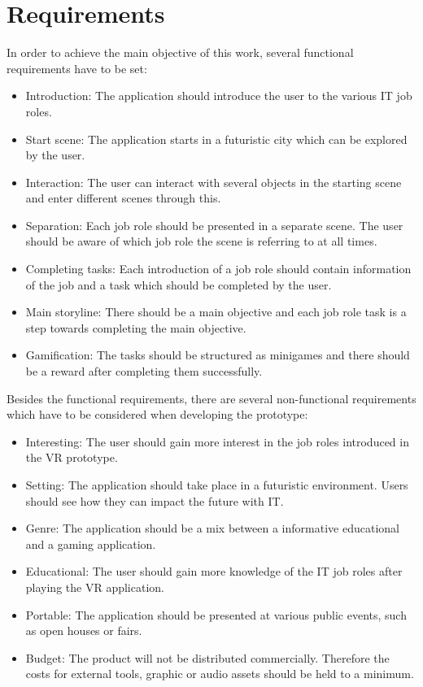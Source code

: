 \section{Requirements}
In order to achieve the main objective of this work, several functional requirements have to be set:\\
\begin{itemize}
\item Introduction: The application should introduce the user to the various IT job roles.
\item Start scene: The application starts in a futuristic city which can be explored by the user.
\item Interaction: The user can interact with several objects in the starting scene and enter different scenes through this.
\item Separation: Each job role should be presented in a separate scene. The user should be aware of which job role the scene is referring to at all times.
\item Completing tasks: Each introduction of a job role should contain information of the job and a task which should be completed by the user.
\item Main storyline: There should be a main objective and each job role task is a step towards completing the main objective.
\item Gamification: The tasks should be structured as minigames and there should be a reward after completing them successfully.

\end{itemize}
Besides the functional requirements, there are several non-functional requirements which have to be considered when developing the prototype:
\begin{itemize}
\item Interesting: The user should gain more interest in the job roles introduced in the VR prototype.
\item Setting: The application should take place in a futuristic environment. Users should see how they can impact the future with IT.
\item Genre: The application should be a mix between a informative educational and a gaming application.
\item Educational: The user should gain more knowledge of the IT job roles after playing the VR application.
\item Portable: The application should be presented at various public events, such as open houses or fairs.
\item Budget: The product will not be distributed commercially. Therefore the costs for external tools, graphic or audio assets should be held to a minimum.
\end{itemize}

